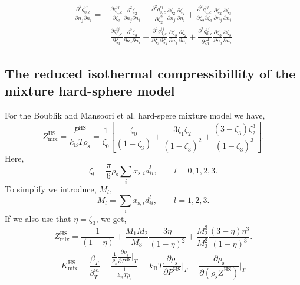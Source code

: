 \documentclass[english]{../thermomemo/thermomemo}
\newcommand{\ponel}[3]{\frac{\partial #1}{\partial #2}\bigg|_{#3}} %
\newcommand*{\lb}{\left(}
\newcommand*{\rb}{\right)}
\newcommand{\hs}{\text{HS}\xspace}
\newcommand{\id}{\ensuremath{\text{id}}\xspace}
\newcommand{\seg}{\ensuremath{\text{s}}\xspace}
\newcommand{\kB}{\ensuremath{k_{\text{B}}}\xspace}
\newcommand{\z}{\zeta}
\newcommand{\mix}{\ensuremath{\text{mix}}\xspace}
\begin{document}
\begin{equation}
\begin{split}
\frac{\partial^2 g_{0,c}^{ij}}{\partial n_j\partial n_i}=&\frac{\partial g_{0,c}^{ij}}{\partial \z_{2}}\frac{\partial^2 \z_{2}}{\partial n_j\partial n_i}+\frac{\partial^2 g_{0,c}^{ij}}{\partial \z_{2}^2}\frac{\partial \z_{2}}{\partial n_j}\frac{\partial \z_{2}}{\partial n_i}+\frac{\partial^2 g_{0,c}^{ij}}{\partial \z_{2}\partial \z_3}\frac{\partial \z_{2}}{\partial n_j}\frac{\partial \z_{3}}{\partial n_i} \\
&\frac{\partial g_{0,c}^{ij}}{\partial \z_{3}}\frac{\partial^2 \z_{3}}{\partial n_j\partial n_i}+\frac{\partial^2 g_{0,c}^{ij}}{\partial \z_{3}\partial \z_2}\frac{\partial \z_{3}}{\partial n_j}\frac{\partial \z_{2}}{\partial n_i} +\frac{\partial^2 g_{0,c}^{ij}}{\partial \z_{3}^2}\frac{\partial \z_{3}}{\partial n_j}\frac{\partial \z_{3}}{\partial n_i}  
\end{split}
\end{equation}

\subsection{The reduced isothermal compressibillity of the mixture hard-sphere model}

For the Boublik and Mansoori et al. hard-spere mixture model we have,
\begin{equation}
  \label{eq:Z_HS_mix}
  Z_\mix^\hs = \frac{P^\hs}{\kB T \rho_\seg} = \frac{1}{\z_0} \left[ \frac{\z_0}{\lb 1-\z_3 \rb} + \frac{3\z_1\z_2}{(1-\z_3)^2} + \frac{\lb 3 - \z_3 \rb\z_2^3}{\lb 1 - \z_3\rb^3}  \right].
\end{equation}
Here,
\begin{equation}
  \label{eq:z_l_redef}
  \z_l = \frac{\pi}{6} \rho_\seg \sum_i x_{\seg,i} d_{ii}^l, \qquad l = 0,1,2,3.
\end{equation}
To simplify we introduce, $M_l$,
\begin{equation}
  \label{eq:M_l}
  M_l =  \sum_i x_{\seg,i} d_{ii}^l, \qquad l = 1,2,3.
\end{equation}
If we also use that $\eta = \z_3$, we get,
\begin{equation}
  \label{eq:Z_HS_mix_eta}
  Z_\mix^\hs = \frac{1}{\lb 1-\eta \rb} + \frac{M_1M_2}{M_3}\frac{3\eta}{(1-\eta)^2} + \frac{M_2^3}{M_3^2}\frac{\lb 3 - \eta \rb\eta^3}{\lb 1 - \eta\rb^3}.
\end{equation}
\begin{equation}
  \label{eq:K_HS_mix_def}
  K_\mix^\hs = \frac{\beta_T}{\beta_T^\id} = \frac{\frac{1}{\rho_\seg} \ponel{\rho_\seg}{P^\hs}{T}}{\frac{1}{\kB T \rho_\seg}} = \kB T \ponel{\rho_\seg}{P^\hs}{T} = \ponel{\rho_\seg}{\lb \rho_\seg Z^\hs \rb}{T}
\end{equation}
\end{document}
